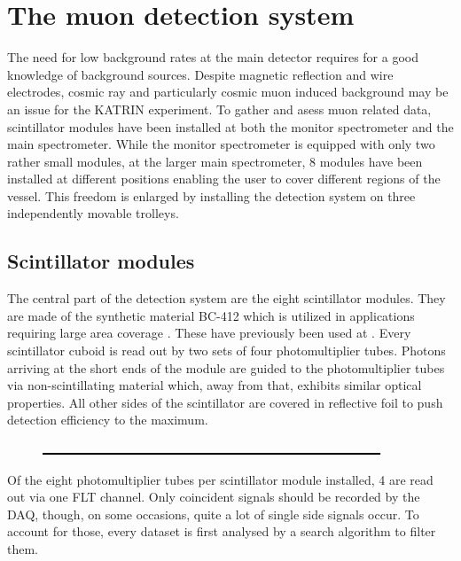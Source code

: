 
\chapter{The muon detection system}
\label{ch:The muon detection system}
  The need for low background rates at the main detector requires for a good knowledge of background sources. Despite magnetic reflection and wire electrodes, cosmic ray and particularly cosmic muon induced background may be an issue for the KATRIN experiment. To gather and asess muon related data, scintillator modules have been installed at both the monitor spectrometer and the main spectrometer. While the monitor spectrometer is equipped with only two rather small modules, at the larger main spectrometer, 8 modules have been installed at different positions enabling the user to cover different regions of the vessel. This freedom is enlarged by installing the detection system on three independently movable trolleys.
  \section{Scintillator modules}
  \label{ch:The muon detection system:sec:Scintillator modules}
  The central part of the detection system are the eight scintillator modules. They are made of the synthetic material BC-412 which is utilized in applications requiring large area coverage \cite{scintillatorManual}. These have previously been used at  . Every scintillator cuboid is read out by two sets of four photomultiplier tubes. Photons arriving at the short ends of the module are guided to the photomultiplier tubes via non-scintillating material which, away from that, exhibits similar optical properties. All other sides of the scintillator are covered in reflective foil to push detection efficiency to the maximum.
  \begin{figure}
    \centering
    \includegraphics[width = 0.9\textwidth]{graphics/dummy.eps}	
  \end{figure}
  Of the eight photomultiplier tubes per scintillator module installed, 4 are read out via one FLT channel. Only coincident signals should be recorded by the DAQ, though, on some occasions, quite a lot of single side signals occur. To account for those, every dataset is first analysed by a search algorithm to filter them.
  

